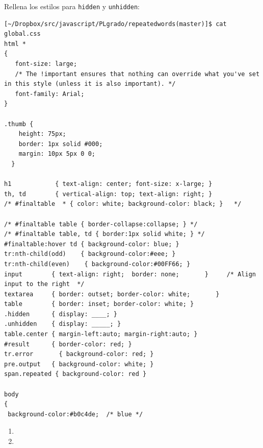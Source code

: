 Rellena los estilos para \verb|hidden| y \verb|unhidden|:
\begin{verbatim}
[~/Dropbox/src/javascript/PLgrado/repeatedwords(master)]$ cat global.css 
html *
{
   font-size: large; 
   /* The !important ensures that nothing can override what you've set in this style (unless it is also important). */
   font-family: Arial;
}

.thumb {
    height: 75px;
    border: 1px solid #000;
    margin: 10px 5px 0 0;
  }

h1            { text-align: center; font-size: x-large; }
th, td        { vertical-align: top; text-align: right; }   
/* #finaltable  * { color: white; background-color: black; }   */

/* #finaltable table { border-collapse:collapse; } */
/* #finaltable table, td { border:1px solid white; } */
#finaltable:hover td { background-color: blue; } 
tr:nth-child(odd)    { background-color:#eee; }
tr:nth-child(even)    { background-color:#00FF66; }
input        { text-align: right;  border: none;       }     /* Align input to the right  */
textarea     { border: outset; border-color: white;       }                        
table        { border: inset; border-color: white; }
.hidden      { display: ____; }
.unhidden    { display: _____; }
table.center { margin-left:auto; margin-right:auto; }
#result      { border-color: red; }
tr.error       { background-color: red; }
pre.output   { background-color: white; }
span.repeated { background-color: red }

body
{
 background-color:#b0c4de;  /* blue */
\end{verbatim}

\begin{enumerate}
\item 
{}
\item 
{}
\end{enumerate}

